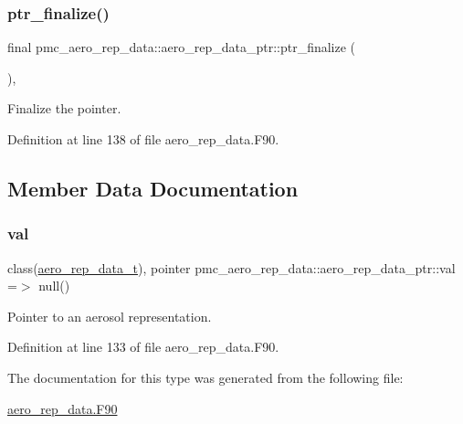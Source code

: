 \subsubsection{\texorpdfstring{ptr\+\_\+finalize()}{ptr\_finalize()}}
{\footnotesize\ttfamily final pmc\+\_\+aero\+\_\+rep\+\_\+data\+::aero\+\_\+rep\+\_\+data\+\_\+ptr\+::ptr\+\_\+finalize (\begin{DoxyParamCaption}{ }\end{DoxyParamCaption})\hspace{0.3cm}{\ttfamily [final]}, {\ttfamily [private]}}



Finalize the pointer. 



Definition at line 138 of file aero\+\_\+rep\+\_\+data.\+F90.



\subsection{Member Data Documentation}
\mbox{\label{structpmc__aero__rep__data_1_1aero__rep__data__ptr_aaf50e4bd503c015406c09649cd458a5a}} 
\subsubsection{\texorpdfstring{val}{val}}
{\footnotesize\ttfamily class(\mbox{\hyperlink{structpmc__aero__rep__data_1_1aero__rep__data__t}{aero\+\_\+rep\+\_\+data\+\_\+t}}), pointer pmc\+\_\+aero\+\_\+rep\+\_\+data\+::aero\+\_\+rep\+\_\+data\+\_\+ptr\+::val =$>$ null()\hspace{0.3cm}{\ttfamily [private]}}



Pointer to an aerosol representation. 



Definition at line 133 of file aero\+\_\+rep\+\_\+data.\+F90.



The documentation for this type was generated from the following file\+:\begin{DoxyCompactItemize}
\item 
\mbox{\hyperlink{aero__rep__data_8_f90}{aero\+\_\+rep\+\_\+data.\+F90}}\end{DoxyCompactItemize}

